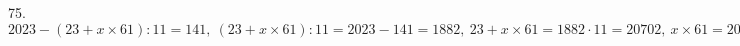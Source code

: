 75. $2023 - (23 + x \times 61) : 11 = 141,\ (23 + x \times 61) : 11 =2023-141=1882,\ 23 + x \times 61=1882\cdot11=20702,\ x \times 61=20702-23=20679,\ x=20679:61=339.$\\
